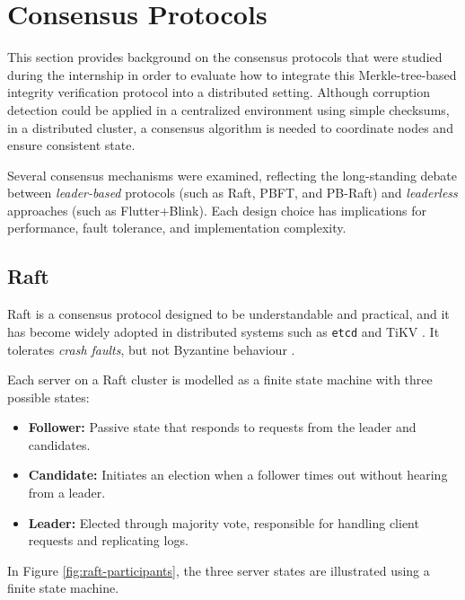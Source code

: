 \section{Consensus Protocols}

This section provides background on the consensus protocols that were studied
during the internship in order to evaluate how to integrate this Merkle-tree-based integrity verification protocol into a distributed setting.  
Although corruption detection could be applied in a centralized environment using simple checksums, in a distributed cluster, a consensus algorithm is needed to coordinate nodes and ensure consistent state.  

Several consensus mechanisms were examined, reflecting the long-standing debate between \emph{leader-based} protocols (such as Raft, PBFT, and PB-Raft) and \emph{leaderless} approaches (such as Flutter+Blink). Each design choice has implications for performance, fault tolerance, and implementation complexity.

\subsection{Raft} \label{sec:raft}

Raft \cite{raft} is a consensus protocol designed to be understandable and practical, and it has become widely adopted in distributed systems such as \texttt{etcd} \cite{etcd-raft} and TiKV \cite{tikv-raft}.
It tolerates \emph{crash faults}, but not Byzantine behaviour \cite{lamport1972byzantine}.

Each server on a Raft cluster is modelled as a finite state machine with three possible states:
\begin{itemize}
    \item \textbf{Follower:} Passive state that responds to requests from the leader and candidates.
    \item \textbf{Candidate:} Initiates an election when a follower times out without hearing from a leader.
    \item \textbf{Leader:} Elected through majority vote, responsible for handling client requests and replicating logs.
\end{itemize}

In Figure \ref{fig:raft-participants}, the three server states are illustrated using a finite state machine.

